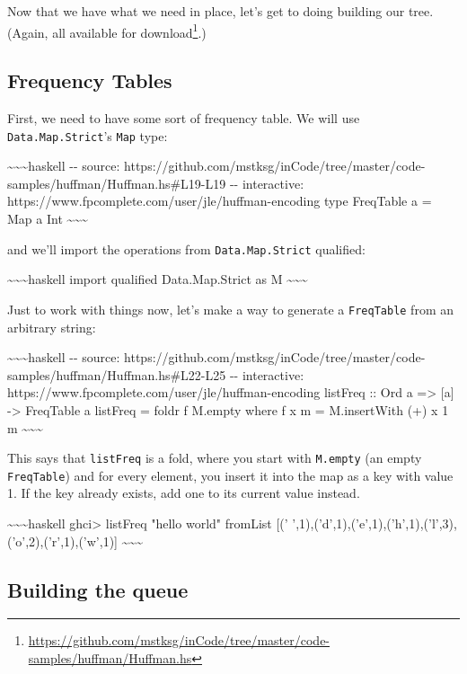 \documentclass[]{article}
\renewcommand{\href}[2]{#2\footnote{\url{#1}}}
\begin{document}
Now that we have what we need in place, let's get to doing building our tree.
(Again, all available
\href{https://github.com/mstksg/inCode/tree/master/code-samples/huffman/Huffman.hs}{for
download}.)

\subsection{Frequency Tables}

First, we need to have some sort of frequency table. We will use
\texttt{Data.Map.Strict}'s \texttt{Map} type:

\textasciitilde{}\textasciitilde{}\textasciitilde{}haskell -\/- source:
https://github.com/mstksg/inCode/tree/master/code-samples/huffman/Huffman.hs\#L19-L19
-\/- interactive: https://www.fpcomplete.com/user/jle/huffman-encoding type
FreqTable a = Map a Int \textasciitilde{}\textasciitilde{}\textasciitilde{}

and we'll import the operations from \texttt{Data.Map.Strict} qualified:

\textasciitilde{}\textasciitilde{}\textasciitilde{}haskell import qualified
Data.Map.Strict as M \textasciitilde{}\textasciitilde{}\textasciitilde{}

Just to work with things now, let's make a way to generate a \texttt{FreqTable}
from an arbitrary string:

\textasciitilde{}\textasciitilde{}\textasciitilde{}haskell -\/- source:
https://github.com/mstksg/inCode/tree/master/code-samples/huffman/Huffman.hs\#L22-L25
-\/- interactive: https://www.fpcomplete.com/user/jle/huffman-encoding listFreq
:: Ord a =\textgreater{} {[}a{]} -\textgreater{} FreqTable a listFreq = foldr f
M.empty where f x m = M.insertWith (+) x 1 m
\textasciitilde{}\textasciitilde{}\textasciitilde{}

This says that \texttt{listFreq} is a fold, where you start with
\texttt{M.empty} (an empty \texttt{FreqTable}) and for every element, you insert
it into the map as a key with value 1. If the key already exists, add one to its
current value instead.

\textasciitilde{}\textasciitilde{}\textasciitilde{}haskell ghci\textgreater{}
listFreq "hello world" fromList {[}('
',1),('d',1),('e',1),('h',1),('l',3),('o',2),('r',1),('w',1){]}
\textasciitilde{}\textasciitilde{}\textasciitilde{}

\subsection{Building the queue}
\end{document}
